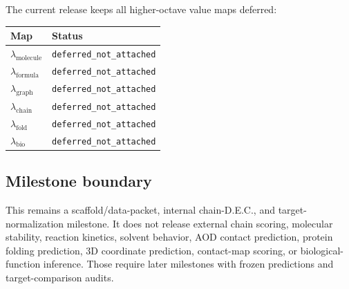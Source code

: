 The current release keeps all higher-octave value maps deferred:
\begin{center}
\begin{tabular}{@{}ll@{}}
\toprule
Map & Status \\
\midrule
$\lambda_{\mathrm{molecule}}$ & \texttt{deferred\_not\_attached} \\
$\lambda_{\mathrm{formula}}$ & \texttt{deferred\_not\_attached} \\
$\lambda_{\mathrm{graph}}$ & \texttt{deferred\_not\_attached} \\
$\lambda_{\mathrm{chain}}$ & \texttt{deferred\_not\_attached} \\
$\lambda_{\mathrm{fold}}$ & \texttt{deferred\_not\_attached} \\
$\lambda_{\mathrm{bio}}$ & \texttt{deferred\_not\_attached} \\
\bottomrule
\end{tabular}
\end{center}

\subsection{Milestone boundary}

This remains a scaffold/data-packet, internal chain-D.E.C., and target-normalization milestone. It does not release external chain scoring, molecular stability, reaction kinetics, solvent behavior, AOD contact prediction, protein folding prediction, 3D coordinate prediction, contact-map scoring, or biological-function inference. Those require later milestones with frozen predictions and target-comparison audits.
